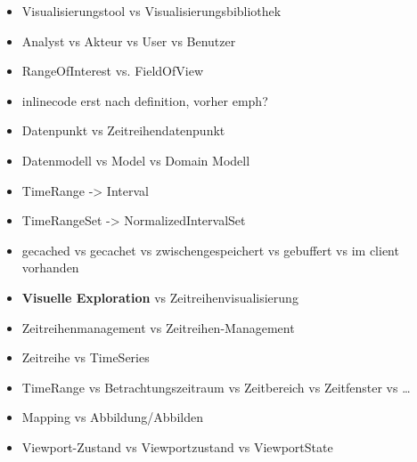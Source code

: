 \begin{itemize}
    \item Visualisierungstool vs Visualisierungsbibliothek
    \item Analyst vs Akteur vs User vs Benutzer
    \item RangeOfInterest vs. FieldOfView
    \item inlinecode erst nach definition, vorher emph?
    \item Datenpunkt vs Zeitreihendatenpunkt
    \item Datenmodell vs Model vs Domain Modell
    \item TimeRange -> Interval
    \item TimeRangeSet -> NormalizedIntervalSet
    \item gecached vs gecachet vs zwischengespeichert vs gebuffert vs im client vorhanden
    \item \textbf{Visuelle Exploration} vs Zeitreihenvisualisierung
    \item Zeitreihenmanagement vs Zeitreihen-Management
    \item Zeitreihe vs TimeSeries
    \item TimeRange vs Betrachtungszeitraum vs Zeitbereich vs Zeitfenster vs \ldots
    \item Mapping vs Abbildung/Abbilden
    \item Viewport-Zustand vs Viewportzustand vs ViewportState
\end{itemize}
